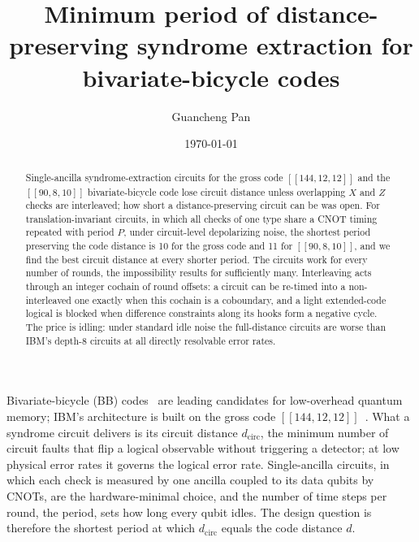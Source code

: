 \documentclass[aps,prl,twocolumn,superscriptaddress,nofootinbib]{revtex4-2}
\newcommand{\dcirc}{d_{\mathrm{circ}}}
\newcommand{\code}[1]{[[#1]]}
\begin{document}
\title{Minimum period of distance-preserving syndrome extraction for bivariate-bicycle codes}

\author{Guancheng Pan}
\date{\today}

\begin{abstract}
Single-ancilla syndrome-extraction circuits for the gross code $\code{144,12,12}$ and the
$\code{90,8,10}$ bivariate-bicycle code lose circuit distance unless overlapping $X$ and
$Z$ checks are interleaved; how short a distance-preserving circuit can be was open. For
translation-invariant circuits, in which all checks of one type share a CNOT timing
repeated with period $P$, under circuit-level depolarizing noise, the shortest period
preserving the code distance is 10 for the gross code and 11 for $\code{90,8,10}$, and we
find the best circuit distance at every shorter period. The circuits work for every number
of rounds, the impossibility results for sufficiently many. Interleaving acts through an
integer cochain of round offsets: a circuit can be re-timed into a non-interleaved one
exactly when this cochain is a coboundary, and a light extended-code logical is blocked
when difference constraints along its hooks form a negative cycle. The price is idling:
under standard idle noise the full-distance circuits are worse than IBM's depth-8
circuits at all directly resolvable error rates.
\end{abstract}

\maketitle

Bivariate-bicycle (BB) codes~\cite{Bravyi2024} are leading candidates for
low-overhead quantum memory; IBM's architecture is built on the gross code
$\code{144,12,12}$~\cite{Bravyi2024,TourDeGross}. What a syndrome circuit delivers is
its circuit distance $\dcirc$, the minimum number of circuit faults that flip a logical
observable without triggering a detector; at low physical error rates it governs the
logical error rate. Single-ancilla circuits, in which each check is measured by one
ancilla coupled to its data qubits by CNOTs, are the hardware-minimal choice, and the
number of time steps per round, the period, sets how long every qubit idles. The design
question is therefore the shortest period at which $\dcirc$ equals the code distance $d$.
\end{document}
